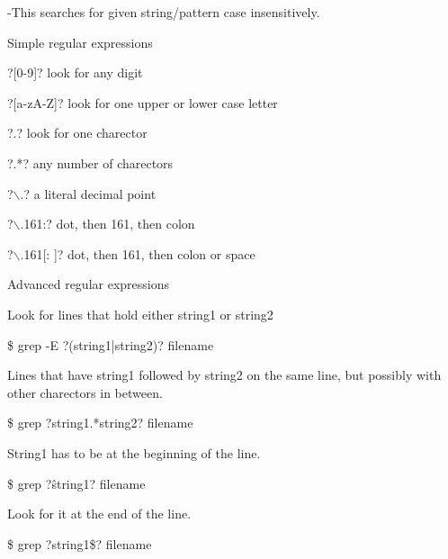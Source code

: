 \documentclass{article}
\begin{document}
				\hspace{10mm}-This searches for given string/pattern case insensitively.


	Simple regular expressions

				\hspace{10mm}?[0-9]? look for any digit



				\hspace{10mm}?[a-zA-Z]? look for one upper or lower case letter	


				\hspace{10mm}?.? look for one charector
				
				\hspace{10mm}?.*? any number of charectors
				
				\hspace{10mm} ?$\backslash$.? a literal decimal point
				
				\hspace{10mm}?$\backslash$.161:? dot, then 161, then colon 
				
				\hspace{10mm}?$\backslash$.161[: ]? dot, then 161, then colon or space	


	Advanced regular expressions

				\hspace{10mm}Look for lines that hold either string1 or string2
				
				\hspace{10mm}\$ grep -E ?(string1|string2)? filename 
				
				\hspace{10mm}Lines that have string1 followed by string2 on the same line, but possibly with other charectors in between.
				
				\hspace{10mm}\$ grep ?string1.*string2? filename	
				
				\hspace{10mm}String1 has to be at the beginning of the line.
				
				\hspace{10mm}\$ grep ?\^string1? filename
				
				Look for it at the end of the line.
				
				\hspace{10mm}\$ grep ?string1\$? filename
\end{document}
